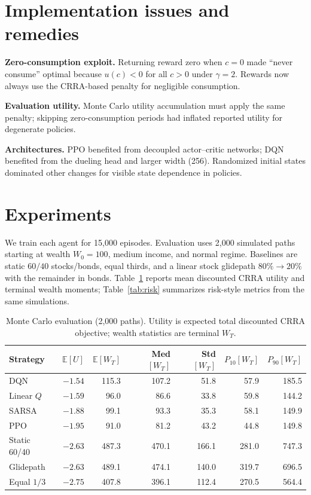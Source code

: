 \documentclass[11pt,a4paper]{article}
\begin{document}
\section{Implementation issues and remedies}

\textbf{Zero-consumption exploit.} Returning reward zero when $c=0$ made ``never consume'' optimal because $u(c)<0$ for all $c>0$ under $\gamma=2$. Rewards now always use the CRRA-based penalty for negligible consumption.

\textbf{Evaluation utility.} Monte Carlo utility accumulation must apply the same penalty; skipping zero-consumption periods had inflated reported utility for degenerate policies.

\textbf{Architectures.} PPO benefited from decoupled actor--critic networks; DQN benefited from the dueling head and larger width (256). Randomized initial states dominated other changes for visible state dependence in policies.

\section{Experiments}

We train each agent for 15{,}000 episodes. Evaluation uses 2{,}000 simulated paths starting at wealth $W_0=100$, medium income, and normal regime. Baselines are static $60/40$ stocks/bonds, equal thirds, and a linear stock glidepath $80\%\to 20\%$ with the remainder in bonds. Table~\ref{tab:main} reports mean discounted CRRA utility and terminal wealth moments; Table~\ref{tab:risk} summarizes risk-style metrics from the same simulations.

\begin{table}[htbp]
  \centering
  \caption{Monte Carlo evaluation (2{,}000 paths). Utility is expected total discounted CRRA objective; wealth statistics are terminal $W_T$.}
  \label{tab:main}
  \begin{tabular}{l r rrr r r}
    \toprule
    Strategy & $\mathbb{E}[U]$ & $\mathbb{E}[W_T]$ & Med$[W_T]$ & Std$[W_T]$ & $P_{10}[W_T]$ & $P_{90}[W_T]$ \\
    \midrule
    DQN & $-1.54$ & 115.3 & 107.2 & 51.8 & 57.9 & 185.5 \\
    Linear $Q$ & $-1.59$ & 96.0 & 86.6 & 33.8 & 59.8 & 144.2 \\
    SARSA & $-1.88$ & 99.1 & 93.3 & 35.3 & 58.1 & 149.9 \\
    PPO & $-1.95$ & 91.0 & 81.2 & 43.2 & 44.8 & 149.8 \\
    \midrule
    Static 60/40 & $-2.63$ & 487.3 & 470.1 & 166.1 & 281.0 & 747.3 \\
    Glidepath & $-2.63$ & 489.1 & 474.1 & 140.0 & 319.7 & 696.5 \\
    Equal $1/3$ & $-2.75$ & 407.8 & 396.1 & 112.4 & 270.5 & 564.4 \\
    \bottomrule
  \end{tabular}
\end{table}
\end{document}

